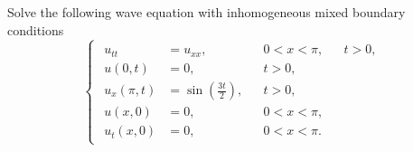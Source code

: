 \documentclass[plain]{pset}
\begin{document}
\begin{problem}
Solve the following wave equation with inhomogeneous mixed boundary conditions
\[
    \begin{cases}
        \begin{aligned}
            u_{tt}      & = u_{xx},                        &  & 0 < x < \pi, &  & t > 0, \\
            u(0, t)     & = 0,                             &  & t > 0,                   \\
            u_x(\pi, t) & = \sin\left(\frac{3t}{2}\right), &  & t > 0,                   \\
            u(x, 0)     & = 0,                             &  & 0 < x < \pi,             \\
            u_t(x, 0)   & = 0,                             &  & 0 < x < \pi.
        \end{aligned}
    \end{cases}
\]
\end{problem}
\end{document}
